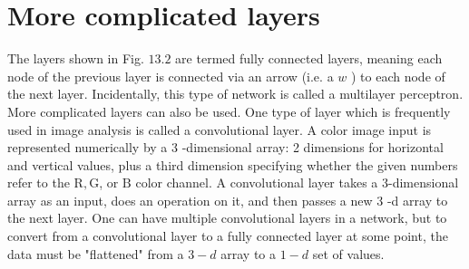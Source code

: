 \documentclass{book}
\theoremstyle{plain}
\theoremstyle{definition}
\numberwithin{exm}{chapter}
\theoremstyle{remark}
\theoremstyle{summary}
\theoremstyle{overview}
\begin{document}
\section*{More complicated layers}
The layers shown in Fig. $13.2$ are termed fully connected layers, meaning each node of the previous layer is connected via an arrow (i.e. a $w$ ) to each node of the next layer. Incidentally, this type of network is called a multilayer perceptron. More complicated layers can also be used. One type of layer which is frequently used in image analysis is called a convolutional layer. A color image input is represented numerically by a 3 -dimensional array: 2 dimensions for horizontal and vertical values, plus a third dimension specifying whether the given numbers refer to the $\mathrm{R}, \mathrm{G}$, or $\mathrm{B}$ color channel. A convolutional layer takes a 3-dimensional array as an input, does an operation on it, and then passes a new 3 -d array to the next layer. One can have multiple convolutional layers in a network, but to convert from a convolutional layer to a fully connected layer at some point, the data must be "flattened" from a $3-d$ array to a $1-d$ set of values.
\end{document}
